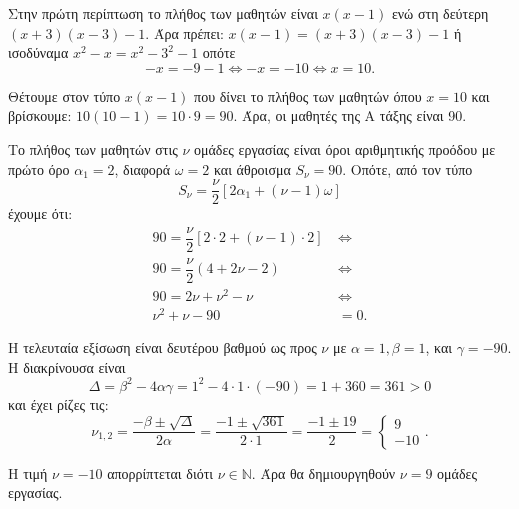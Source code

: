 
\begin{alist}
\item Στην πρώτη περίπτωση το πλήθος των μαθητών είναι $x(x - 1)$ ενώ στη δεύτερη
$(x + 3)(x - 3) - 1$. Άρα πρέπει:
$x(x - 1) = (x + 3)(x - 3) - 1$
ή ισοδύναμα
$x^2 - x = x^2 - 3^2 - 1$
οπότε
\[-x = -9 - 1 \Leftrightarrow -x = -10 \Leftrightarrow x = 10.\]

\item Θέτουμε στον τύπο $x(x - 1)$ που δίνει το πλήθος των μαθητών όπου $x = 10$ και
βρίσκουμε:
$10(10 - 1) = 10 \cdot 9 = 90$.
Άρα, οι μαθητές της Α τάξης είναι 90.

\item Το πλήθος των μαθητών στις $\nu$ ομάδες εργασίας είναι όροι αριθμητικής προόδου με πρώτο
όρο $\alpha_1 = 2$, διαφορά $\omega = 2$ και άθροισμα $S_\nu = 90$. Οπότε, από τον τύπο
\[S_\nu = \dfrac{\nu}{2}[2\alpha_1 + (\nu - 1)\omega]\]
έχουμε ότι:
\begin{align*}
90 = \dfrac{\nu}{2}[2 \cdot 2 + (\nu - 1) \cdot 2] \ &\Leftrightarrow \\
90 = \dfrac{\nu}{2}(4 + 2\nu - 2) \ &\Leftrightarrow \\
90 = 2\nu + \nu^2 - \nu \ &\Leftrightarrow \\
\nu^2 + \nu - 90 &= 0.
\end{align*}

Η τελευταία εξίσωση είναι δευτέρου βαθμού ως προς $\nu$ με $\alpha = 1, \beta = 1$, και $\gamma = -90$. Η
διακρίνουσα είναι
\[\Delta = \beta^2 - 4\alpha\gamma = 1^2 - 4 \cdot 1 \cdot (-90) = 1 + 360 = 361 > 0\]
και έχει ρίζες τις:
\[\nu_{1,2} = \dfrac{-\beta \pm \sqrt{\Delta}}{2\alpha} = \dfrac{-1 \pm \sqrt{361}}{2 \cdot 1} = \dfrac{-1 \pm 19}{2} = \begin{cases} 9 \\ -10 \end{cases}.\]

Η τιμή $\nu = -10$ απορρίπτεται διότι $\nu \in \mathbb{N}$. Άρα θα δημιουργηθούν $\nu = 9$ ομάδες εργασίας.
\end{alist}

